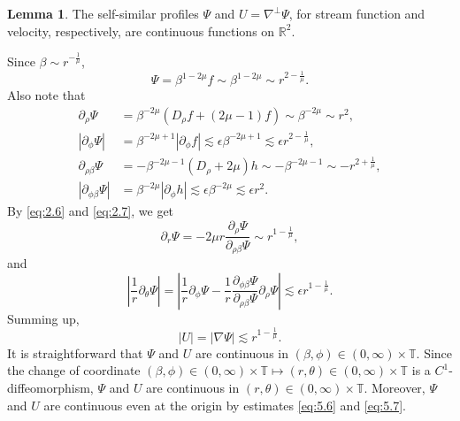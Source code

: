 \documentclass[11pt]{article}
\makeatletter
\renewenvironment{proof}[1][\proofname]{\par
  \vspace{-.7\topsep}%
  \pushQED{\qed}%
  \normalfont
  \topsep0pt \partopsep0pt %
  \trivlist
  \item[\hskip\labelsep
        \itshape
    #1\@addpunct{.}]\ignorespaces
}{%
  \popQED\endtrivlist\@endpefalse
  \addvspace{6pt plus 6pt} %
}
\theoremstyle{definition}
\newtheorem{lemma}[theorem]{Lemma}
\theoremstyle{remark}
\numberwithin{equation}{section}
\newcommand{\mbb}{\mathbb}
\newcommand{\R}{\mbb{R}}
\newcommand{\del}{\partial}
\newcommand{\grad}{\nabla}
\newcommand{\abs}[1]{\left\lvert #1 \right\rvert}
\makeatother
\begin{document}
\begin{lemma} \label{lem:5.5}
The self-similar profiles $\Psi$ and $U = \grad^\perp \Psi$, for stream function and velocity, respectively, are continuous functions on $\R^2$.
\end{lemma}
\begin{proof}
Since $\beta \sim r^{-\frac{1}{\mu}}$,
\begin{equation} \label{eq:5.6}
\Psi = \beta^{1-2\mu} f \sim \beta^{1-2\mu} \sim r^{2 - \frac{1}{\mu}}.
\end{equation}
Also note that
\begin{align*}
\del_\rho \Psi &= \beta^{-2\mu}(D_\rho f + (2\mu - 1) f) \sim \beta^{-2\mu} \sim r^2, \\
\abs{\del_\phi \Psi} &= \beta^{-2\mu + 1} \abs{\del_\phi f} \lesssim \epsilon \beta^{-2\mu + 1} \lesssim \epsilon r^{2 - \frac{1}{\mu}}, \\
\del_{\rho \beta} \Psi &= - \beta^{-2\mu - 1} (D_\rho + 2\mu) h \sim -\beta^{-2\mu - 1} \sim -r^{2 + \frac{1}{\mu}}, \\
\abs{\del_{\phi \beta} \Psi} &= \beta^{-2\mu} \abs{\del_\phi h} \lesssim \epsilon \beta^{-2\mu} \lesssim \epsilon r^{2}.
\end{align*}
By \eqref{eq:2.6} and \eqref{eq:2.7}, we get
\[ \del_r \Psi = -2\mu r \frac{\del_\rho \Psi}{\del_{\rho\beta}\Psi} \sim r^{1 - \frac{1}{\mu}},\]
and
\[ \abs{\frac{1}{r} \del_\theta \Psi} = \abs{\frac{1}{r} \del_\phi \Psi - \frac{1}{r} \frac{\del_{\phi\beta}\Psi}{\del_{\rho \beta} \Psi} \del_\rho \Psi} \lesssim \epsilon r^{1-\frac{1}{\mu}}.\]
Summing up,
\begin{equation} \label{eq:5.7}
|U| = |\grad \Psi| \lesssim r^{1 - \frac{1}{\mu}}.
\end{equation}
It is straightforward that $\Psi$ and $U$ are continuous in $(\beta,\phi) \in (0,\infty) \times \mbb{T}$. Since the change of coordinate $(\beta,\phi) \in (0,\infty) \times \mbb{T} \mapsto (r,\theta) \in (0,\infty) \times \mbb{T}$ is a $C^1$-diffeomorphism, $\Psi$ and $U$ are continuous in $(r,\theta) \in (0,\infty) \times \mbb{T}$. Moreover, $\Psi$ and $U$ are continuous even at the origin by estimates \eqref{eq:5.6} and \eqref{eq:5.7}.
\end{proof}
\end{document}
